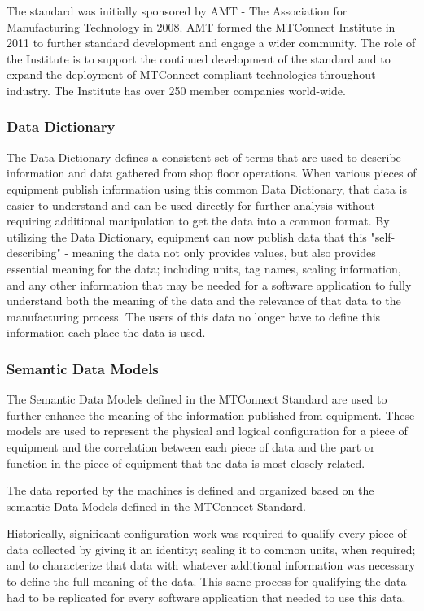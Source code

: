 The standard was initially sponsored by AMT - The Association for Manufacturing Technology in 2008.  AMT formed the MTConnect Institute in 2011 to further standard development and engage a wider community. The role of the Institute is to support the continued development of the standard and to expand the deployment of MTConnect compliant technologies throughout industry. The Institute has over 250 member companies world-wide.  


\subsubsection{Data Dictionary}

The Data Dictionary defines a consistent set of terms that are used to describe information and data gathered from shop floor operations.   When various pieces of equipment publish information using this common Data Dictionary, that data is easier to understand and can be used directly for further analysis without requiring additional manipulation to get the data into a common format.  By utilizing the Data Dictionary, equipment can now publish data that this "self-describing" - meaning the data not only provides values, but also provides essential meaning for the data; including units, tag names, scaling information, and any other information that may be needed for a software application to fully understand both the meaning of the data and the relevance of that data to the manufacturing process.    The users of this data no longer have to define this information each place the data is used. 

\subsubsection{Semantic Data Models}
The Semantic Data Models defined in the MTConnect Standard are used to further enhance the meaning of the information published from equipment.  These models are used to represent the physical and logical configuration for a piece of equipment and the correlation between each piece of data and the part or function in the piece of equipment that the data is most closely related.   

The data reported by the machines is defined and organized based on the semantic Data Models defined in the MTConnect Standard.   

Historically, significant configuration work was required to qualify every piece of data collected by giving it an identity; scaling it to common units, when required; and to characterize that data with whatever additional information was necessary to define the full meaning of the data.   This same process for qualifying the data had to be replicated for every software application that needed to use this data.    


